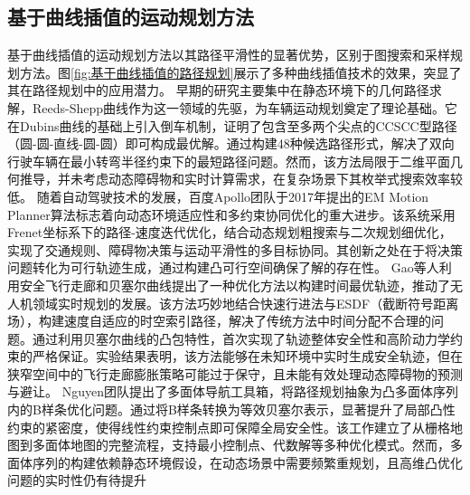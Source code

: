 \documentclass[master,academic]{ysuthesis} %
\begin{document}
		\subsection{基于曲线插值的运动规划方法}
		基于曲线插值的运动规划方法以其路径平滑性的显著优势，区别于图搜索和采样规划方法。图\ref{fig:基于曲线插值的路径规划}展示了多种曲线插值技术的效果，突显了其在路径规划中的应用潜力。
		早期的研究主要集中在静态环境下的几何路径求解，Reeds-Shepp曲线\cite{reeds1990optimal}作为这一领域的先驱，为车辆运动规划奠定了理论基础。它在Dubins曲线\cite{gupta2022shortest}的基础上引入倒车机制，证明了包含至多两个尖点的CCSCC型路径（圆-圆-直线-圆-圆）即可构成最优解。通过构建48种候选路径形式，解决了双向行驶车辆在最小转弯半径约束下的最短路径问题。然而，该方法局限于二维平面几何推导，并未考虑动态障碍物和实时计算需求，在复杂场景下其枚举式搜索效率较低。
		随着自动驾驶技术的发展，百度Apollo团队于2017年提出的EM Motion Planner算法\cite{fan2018baidu}标志着向动态环境适应性和多约束协同优化的重大进步。该系统采用Frenet坐标系下的路径-速度迭代优化，结合动态规划粗搜索与二次规划细优化，实现了交通规则、障碍物决策与运动平滑性的多目标协同。其创新之处在于将决策问题转化为可行轨迹生成，通过构建凸可行空间确保了解的存在性。
		Gao等人\cite{Gao2018OnlineST}利用安全飞行走廊和贝塞尔曲线\cite{lee2021optimal}提出了一种优化方法以构建时间最优轨迹，推动了无人机领域实时规划的发展。该方法巧妙地结合快速行进法与ESDF（截断符号距离场），构建速度自适应的时空索引路径，解决了传统方法中时间分配不合理的问题。通过利用贝塞尔曲线的凸包特性，首次实现了轨迹整体安全性和高阶动力学约束的严格保证。实验结果表明，该方法能够在未知环境中实时生成安全轨迹，但在狭窄空间中的飞行走廊膨胀策略可能过于保守，且未能有效处理动态障碍物的预测与避让。
		Nguyen团队\cite{10160561}提出了多面体导航工具箱，将路径规划抽象为凸多面体序列内的B样条优化问题。通过将B样条转换为等效贝塞尔表示，显著提升了局部凸性约束的紧密度，使得线性约束控制点即可保障全局安全性。该工作建立了从栅格地图到多面体地图的完整流程，支持最小控制点、代数解等多种优化模式。然而，多面体序列的构建依赖静态环境假设，在动态场景中需要频繁重规划，且高维凸优化问题的实时性仍有待提升
\end{document}
